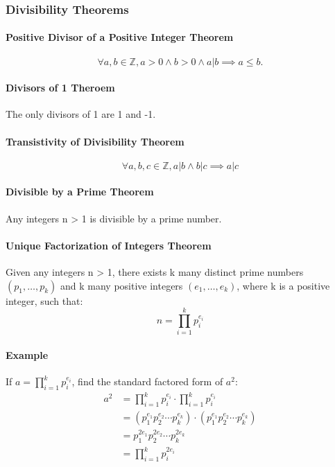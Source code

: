 \subsubsection*{Divisibility Theorems}
\paragraph*{Positive Divisor of a Positive Integer Theorem}
\begin{equation*}
    \forall a,b \in \mathbb{Z}, a>0 \land b>0 \land a|b \implies a \leq b.
\end{equation*}

\paragraph*{Divisors of 1 Theroem}
The only divisors of 1 are 1 and -1.

\paragraph*{Transistivity of Divisibility Theorem}
\begin{equation*}
    \forall a,b,c \in \mathbb{Z}, a|b \land b|c \implies a|c
\end{equation*}

\paragraph*{Divisible by a Prime Theorem}
Any integers n > 1 is divisible by a prime number.

\paragraph*{Unique Factorization of Integers Theorem}
Given any integers n > 1, there exists k many distinct prime numbers $(p_1, \dots, p_k)$ and k many positive integers 
$(e_1, \dots, e_k)$, where k is a positive integer, such that:
\begin{equation*}
    n = \prod_{i=1}^k p_i^{e_i}
\end{equation*}

\paragraph*{Example}
If $a = \prod_{i=1}^k p_i^{e_i}$, find the standard factored form of $a^2$:
\begin{align*}
    a^2 &= \prod_{i=1}^k p_i^{e_i} \cdot \prod_{i=1}^k p_i^{e_i}\\
    &= (p_1^{e_1}p_2^{e_2} \cdots p_k^{e_k}) \cdot (p_1^{e_1}p_2^{e_2} \cdots p_k^{e_k})\\
    &= p_1^{2e_1}p_2^{2e_2} \cdots p_k^{2e_k}\\
    &= \prod_{i=1}^k p_i^{2e_i}
\end{align*}

